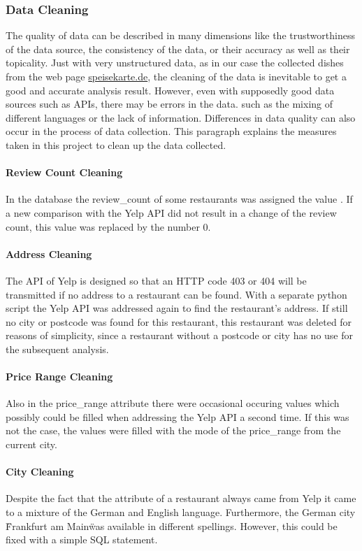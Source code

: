 \subsubsection{Data Cleaning}
\label{subsubsec:cleaning}
The quality of data can be described in many dimensions like \zb{} the trustworthiness of the data source, the consistency of the data,
or their accuracy as well as their topicality.
Just with very unstructured data, as in our case the collected dishes from the web page \url{speisekarte.de}, the cleaning of the data is
inevitable to get a good and accurate analysis result.
However, even with supposedly good data sources such as \acp{API}, there may be errors in the data.
such as \zb{} the mixing of different languages or the lack of information.
Differences in data quality can also occur in the process of data collection.
\newline
This paragraph explains the measures taken in this project to clean up the data collected.
\paragraph{Review Count Cleaning}
In the \pg{} database the review\_count of some restaurants was assigned the value .
If a new comparison with the Yelp \ac{API} did not result in a change of the review count,
this  value was replaced by the number 0.
\paragraph{Address Cleaning}
The \ac{API} of Yelp is designed so that an HTTP code 403 or 404 will be transmitted if no address to a restaurant
can be found.
With a separate python script the Yelp \ac{API} was addressed again to find the restaurant's address.
If still no city or postcode was found for this restaurant, this restaurant was deleted for reasons of simplicity,
since a restaurant without a postcode or city has no use for the subsequent analysis.
\paragraph{Price Range Cleaning}
Also in the price\_range attribute there were occasional occuring  values which possibly could be filled when addressing the Yelp \ac{API} a second time.
If this was not the case, the  values were filled with the mode of the price\_range from the current city.
\paragraph{City Cleaning}
Despite the fact that the  attribute of a restaurant always came from Yelp it came to a mixture of the German and English language.
Furthermore, the German city \"Frankfurt am Main\" was available in different spellings.
However, this could be fixed with a simple \ac{SQL} statement.
